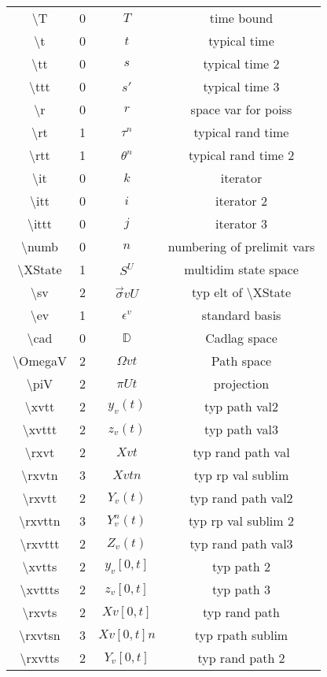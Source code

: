 \documentclass[12pt]{article}
\newcommand{\mb}{\mathbb}
\newcommand{\ep}{\epsilon}
\newcommand{\tbs}{\textbackslash}
\newcommand{\cad}{\mb{D}}							%
\renewcommand{\v}{v}							%
\renewcommand{\U}{U}							%
\renewcommand{\S}{S}							%
\newcommand{\s}{\sigma}							%
\newcommand{\sv}{\vec{\s}}						%
\newcommand{\ev}[1]{\ep^{#1}}					%
\newcommand{\T}{T}								%
\renewcommand{\t}{t}							%
\newcommand{\proj}{\pi}							%
\renewcommand{\tt}{s}							%
\newcommand{\ttt}{s'}							%
\newcommand{\X}{X}								%
\renewcommand{\r}{r}								%
\newcommand{\rt}[1]{\tau^{#1}}						%
\newcommand{\rtt}[1]{\theta^{#1}}					%
\renewcommand{\it}{k}								%
\newcommand{\itt}{i}								%
\newcommand{\ittt}{j}								%
\newcommand{\numb}{n}								%
\newcommand{\XState}[1]{\S^{#1}}				%
\newcommand{\xvtt}[2]{y_{#1}{(#2)}}					%
\newcommand{\xvttt}[2]{z_{#1}{(#2)}}				%
\newcommand{\rxvtt}[2]{Y_{#1}{(#2)}}				%
\newcommand{\rxvttn}[3]{Y_{#1}^{#3}(#2)}			%
\newcommand{\rxvttt}[2]{Z_{#1}{(#2)}}				%
\newcommand{\xvtts}[2]{y_{#1}{#2}}					%
\newcommand{\xvttts}[2]{z_{#1}{#2}}					%
\newcommand{\rxvtts}[2]{Y_{#1}{#2}}					%
\begin{document}
\begin{longtable}{c|c|c|c}
\tbs T&0&\(\T\)									&time bound\\
\tbs t&0&\(\t\)								&typical time\\
\tbs tt&0&\(\tt\)								&typical time 2\\
\tbs ttt&0&\(\ttt\)							&typical time 3\\
\tbs r&0&\(\r\)								&space var for poiss\\
\tbs rt&1&\(\rt{\numb}\)					&typical rand time\\
\tbs rtt&1&\(\rtt{\numb}\)					&typical rand time 2\\
\tbs it&0& \(\it\)							&iterator\\
\tbs itt&0&\(\itt\)							&iterator 2\\
\tbs ittt&0&\(\ittt\)						&iterator 3\\
\tbs numb&0&\(\numb\)						&numbering of prelimit vars\\
\tbs XState&1&\(\XState{\U}\)				&multidim state space\\
\tbs sv&2&\(\sv{\v}{\U}\)					&typ elt of \tbs XState\\
\tbs ev&1&\(\ev{\v}\)						&standard basis\\
\tbs cad&0&\(\cad\)							&Cadlag space\\
\tbs OmegaV&2&\(\Omega{\v}{\t}\)			&Path space\\
\tbs piV&2&\(\proj{\U}{t}\)					&projection\\
\tbs xvtt&2&\(\xvtt{\v}{\t}\)					&typ path val2\\
\tbs xvttt&2&\(\xvttt{\v}{\t}\)				&typ path val3\\
\tbs rxvt&2&\(\X{\v}{\t}\)					&typ rand path val\\
\tbs rxvtn&3&\(\X{\v}{\t}{\numb}\)		&typ rp val sublim\\
\tbs rxvtt&2&\(\rxvtt{\v}{\t}\)				&typ rand path val2\\
\tbs rxvttn&3&\(\rxvttn{\v}{\t}{\numb}\)		&typ rp val sublim 2\\
\tbs rxvttt&2&\(\rxvttt{\v}{\t}\)				&typ rand path val3\\
\tbs xvtts&2&\(\xvtts{\v}{[0,\t]}\)					&typ path 2\\
\tbs xvttts&2&\(\xvttts{\v}{[0,\t]}\)					&typ path 3\\
\tbs rxvts&2&\(\X{\v}{[0,\t]}\)					&typ rand path\\
\tbs rxvtsn&3&\(\X{\v}{[0,\t]}{\numb}\)	&typ rpath sublim\\
\tbs rxvtts&2&\(\rxvtts{\v}{[0,\t]}\)					&typ rand path 2\\

\end{longtable}
\end{document}
